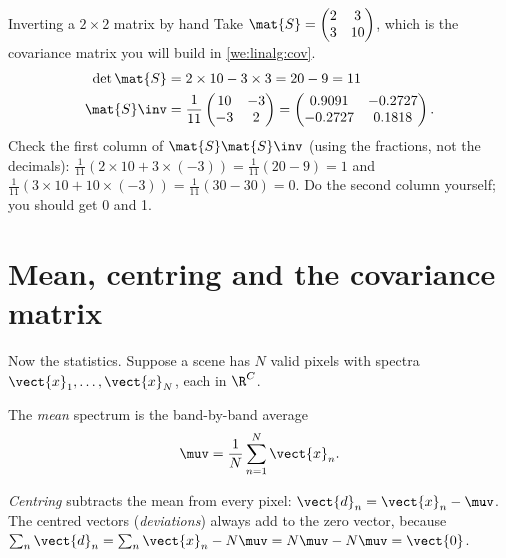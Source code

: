 \begin{worked}[label={we:linalg:inv}]{Inverting a $2\times2$ matrix by hand}
Take $\mat{S} = \begin{pmatrix} 2 & 3 \\ 3 & 10 \end{pmatrix}$, which is the covariance matrix
you will build in \cref{we:linalg:cov}.
\begin{align*}
\det\mat{S} &= 2\times10 - 3\times3 = 20 - 9 = 11\\
\mat{S}\inv &= \frac{1}{11}\begin{pmatrix} 10 & -3 \\ -3 & 2 \end{pmatrix}
= \begin{pmatrix} 0.9091 & -0.2727 \\ -0.2727 & 0.1818 \end{pmatrix}.
\end{align*}
Check the first column of $\mat{S}\mat{S}\inv$ (using the fractions, not the decimals):
$\tfrac{1}{11}(2\times10 + 3\times(-3)) = \tfrac{1}{11}(20 - 9) = 1$ and
$\tfrac{1}{11}(3\times10 + 10\times(-3)) = \tfrac{1}{11}(30 - 30) = 0$. Do the second column
yourself; you should get 0 and 1.
\end{worked}

\section{Mean, centring and the covariance matrix}\label{sec:linalg:covariance}

Now the statistics. Suppose a scene has $N$ valid pixels with spectra
$\vect{x}_1, \dots, \vect{x}_N$, each in $\R^C$.

\begin{definition}
The \emph{mean} spectrum is the band-by-band average
\begin{equation}\label{eq:linalg:mean}
\muv = \frac{1}{N}\sum_{n=1}^{N}\vect{x}_n .
\end{equation}
\end{definition}

\begin{definition}[Centring]
\emph{Centring} subtracts the mean from every pixel: $\vect{d}_n = \vect{x}_n - \muv$. The
centred vectors (\emph{deviations}) always add to the zero vector, because
$\sum_n \vect{d}_n = \sum_n\vect{x}_n - N\muv = N\muv - N\muv = \vect{0}$.
\end{definition}

